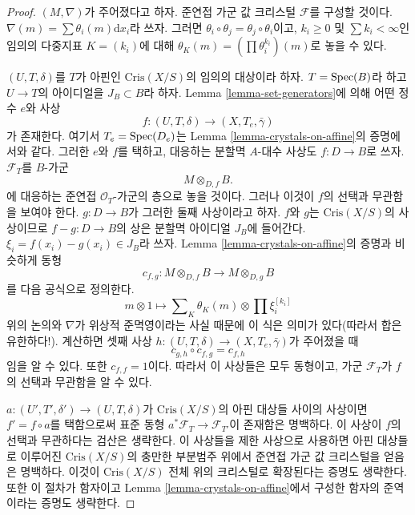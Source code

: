 \begin{proof}
$(M, \nabla)$가 주어졌다고 하자. 준연접 가군 값 크리스털
$\mathcal{F}$를 구성할 것이다.
$\nabla(m) = \sum \theta_i(m)\text{d}x_i$라 쓰자.
그러면 $\theta_i \circ \theta_j = \theta_j \circ \theta_i$이고,
$k_i \geq 0$ 및 $\sum k_i < \infty$인 임의의 다중지표
$K = (k_i)$에 대해 $\theta_K(m) = (\prod \theta_i^{k_i})(m)$로
놓을 수 있다.

\medskip\noindent
$(U, T, \delta)$를 $T$가 아핀인 $\text{Cris}(X/S)$의 임의의
대상이라 하자. $T = \mathop{\mathrm{Spec}}(B)$라 하고 $U \to T$의 아이디얼을
$J_B \subset B$라 하자. Lemma \ref{lemma-set-generators}에 의해
어떤 정수 $e$와 사상
$$
f : (U, T, \delta) \longrightarrow (X, T_e, \bar\gamma)
$$
가 존재한다. 여기서 $T_e = \mathop{\mathrm{Spec}}(D_e)$는 Lemma
\ref{lemma-crystals-on-affine}의 증명에서와 같다. 그러한 $e$와
$f$를 택하고, 대응하는 분할멱 $A$-대수 사상도
$f : D \to B$로 쓰자. $\mathcal{F}_T$를 $B$-가군
$$
M \otimes_{D, f} B.
$$
에 대응하는 준연접 $\mathcal{O}_T$-가군의 층으로 놓을 것이다.
그러나 이것이 $f$의 선택과 무관함을 보여야 한다.
$g : D \to B$가 그러한 둘째 사상이라고 하자. $f$와 $g$는
$\text{Cris}(X/S)$의 사상이므로 $f - g : D \to B$의 상은
분할멱 아이디얼 $J_B$에 들어간다.
$\xi_i = f(x_i) - g(x_i) \in J_B$라 쓰자. Lemma
\ref{lemma-crystals-on-affine}의 증명과 비슷하게 동형
$$
c_{f, g} : M \otimes_{D, f} B \longrightarrow M \otimes_{D, g} B
$$
를 다음 공식으로 정의한다.
$$
m \otimes 1 \longmapsto
\sum\nolimits_K \theta_K(m) \otimes \prod \xi_i^{[k_i]}
$$
위의 논의와 $\nabla$가 위상적 준멱영이라는 사실 때문에 이 식은
의미가 있다(따라서 합은 유한하다!). 계산하면 셋째 사상
$h : (U, T, \delta) \longrightarrow (X, T_e, \bar\gamma)$가
주어졌을 때
$$
c_{g, h} \circ c_{f, g} = c_{f, h}
$$
임을 알 수 있다. 또한 $c_{f, f} = 1$이다. 따라서 이 사상들은
모두 동형이고, 가군 $\mathcal{F}_T$가 $f$의 선택과 무관함을
알 수 있다.

\medskip\noindent
$a : (U', T', \delta') \to (U, T, \delta)$가
$\text{Cris}(X/S)$의 아핀 대상들 사이의 사상이면
$f' = f \circ a$를 택함으로써 표준 동형
$a^*\mathcal{F}_T \to \mathcal{F}_{T'}$이 존재함은 명백하다.
이 사상이 $f$의 선택과 무관하다는 검산은 생략한다. 이 사상들을
제한 사상으로 사용하면 아핀 대상들로 이루어진
$\text{Cris}(X/S)$의 충만한 부분범주 위에서 준연접 가군 값
크리스털을 얻음은 명백하다. 이것이 $\text{Cris}(X/S)$ 전체 위의
크리스털로 확장된다는 증명도 생략한다. 또한 이 절차가 함자이고
Lemma \ref{lemma-crystals-on-affine}에서 구성한 함자의 준역이라는
증명도 생략한다.
\end{proof}

